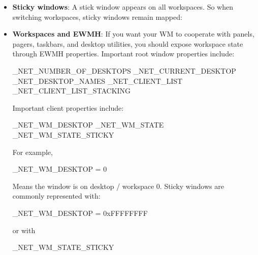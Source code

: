 \documentclass{report}
\begin{document}
\begin{itemize}
\begin{cppcode}
                struct Workspace {
                    Client* clients;
                    Client* focused;
                    enum LayoutKind layout;
                };
            \end{cppcode}
            \bigbreak \noindent 
            When you switch workspaces, you do not globally switch the whole WM’s layout. You use the layout stored inside the workspace:
        \item \textbf{Sticky windows}: A stick window appears on all workspaces. So when switching workspaces, sticky windows remain mapped:
        \item \textbf{Workspaces and EWMH}: If you want your WM to cooperate with panels, pagers, taskbars, and desktop utilities, you should expose workspace state through EWMH properties.
            \bigbreak \noindent 
            Important root window properties include:
            \bigbreak \noindent 
            \begin{cppcode}
                _NET_NUMBER_OF_DESKTOPS
                _NET_CURRENT_DESKTOP
                _NET_DESKTOP_NAMES
                _NET_CLIENT_LIST
                _NET_CLIENT_LIST_STACKING
            \end{cppcode}
            \bigbreak \noindent 
            Important client properties include:
            \bigbreak \noindent 
            \begin{cppcode}
                _NET_WM_DESKTOP
                _NET_WM_STATE
                _NET_WM_STATE_STICKY
            \end{cppcode}
            \bigbreak \noindent 
            For example, 
            \bigbreak \noindent 
            \begin{cppcode}
            _NET_WM_DESKTOP = 0
            \end{cppcode}
            \bigbreak \noindent 
            Means the window is on desktop / workspace 0. Sticky windows are commonly represented with:
            \bigbreak \noindent 
            \begin{cppcode}
            _NET_WM_DESKTOP = 0xFFFFFFFF
            \end{cppcode}
            \bigbreak \noindent 
            or with
            \bigbreak \noindent 
            \begin{cppcode}
            _NET_WM_STATE_STICKY
            \end{cppcode}


    \end{itemize}
\end{document}
